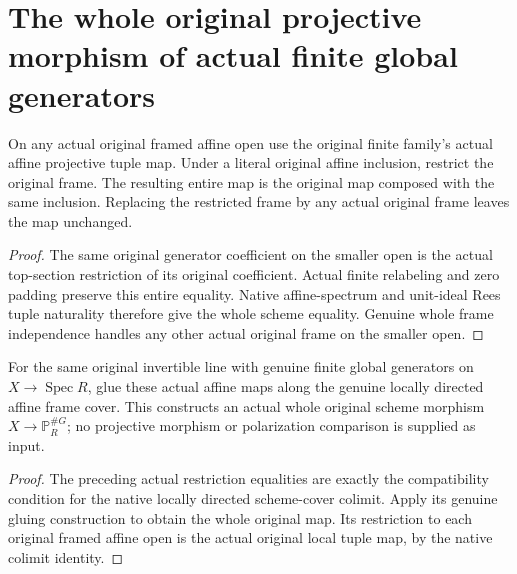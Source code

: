 \section{The whole original projective morphism of actual finite global generators}

\begin{theorem}
\label{thm:fc-generated-line-projective-map-local-compatibility}
\leanok
{}
On any actual original framed affine open use the original finite
family's actual affine projective tuple map. Under a literal original
affine inclusion, restrict the original frame. The resulting entire
map is the original map composed with the same inclusion. Replacing
the restricted frame by any actual original frame leaves the map
unchanged.
\end{theorem}
\begin{proof}
The same original generator coefficient on the smaller open is the
actual top-section restriction of its original coefficient. Actual
finite relabeling and zero padding preserve this entire equality.
Native affine-spectrum and unit-ideal Rees tuple naturality therefore
give the whole scheme equality. Genuine whole frame independence
handles any other actual original frame on the smaller open.
\end{proof}

\begin{definition}
\label{def:fc-generated-line-whole-projective-map}
\leanok
{}
For the same original invertible line with genuine finite global
generators on $X\to\operatorname{Spec}R$, glue these actual affine
maps along the genuine locally directed affine frame cover. This
constructs an actual whole original scheme morphism
$X\to\mathbb P_R^{\#G}$; no projective morphism or polarization
comparison is supplied as input.
\end{definition}
\begin{proof}
The preceding actual restriction equalities are exactly the
compatibility condition for the native locally directed scheme-cover
colimit. Apply its genuine gluing construction to obtain the whole
original map. Its restriction to each original framed affine open is
the actual original local tuple map, by the native colimit identity.
\end{proof}

